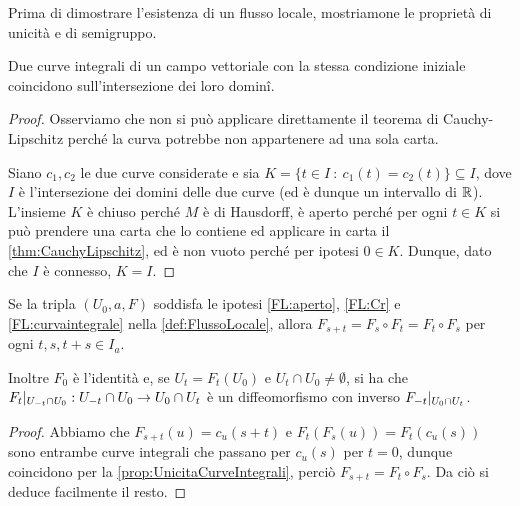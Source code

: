 Prima di dimostrare l'esistenza di un flusso locale, mostriamone le proprietà di unicità e di semigruppo.
 
\begin{proposition} \label{prop:UnicitaCurveIntegrali}
	Due curve integrali di un campo vettoriale con la stessa condizione iniziale coincidono sull'intersezione dei loro dominî.
\end{proposition}

\begin{proof}
	Osserviamo che non si può applicare direttamente il teorema di Cauchy-Lipschitz perché la curva potrebbe non appartenere ad una sola carta.
	
	Siano $c_1,c_2$ le due curve considerate e sia $K=\{ t\in I\ : \ c_1(t)=c_2(t)\}\subseteq I$, dove $I$ è l'intersezione dei domini delle due curve (ed è dunque un intervallo di $\mathbb R$). L'insieme $K$ è chiuso perché $M$ è di Hausdorff, è aperto perché per ogni $t\in K$ si può prendere una carta che lo contiene ed applicare in carta il \cref{thm:CauchyLipschitz}, ed è non vuoto perché per ipotesi $0\in K$. Dunque, dato che $I$ è connesso, $K=I$.
\end{proof}

\begin{proposition}
	Se la tripla $(U_0,a,F)$ soddisfa le ipotesi \ref{FL:aperto}, \ref{FL:Cr} e \ref{FL:curvaintegrale} nella \cref{def:FlussoLocale}, allora $F_{s+t}=F_s\circ F_t=F_t\circ F_s$ per ogni $t,s,t+s\in I_a$.
	
	Inoltre $F_0$ è l'identità e, se $U_t=F_t(U_0)$ e $U_t\cap U_0\ne\emptyset$, si ha che $F_t|_{U_{-t}\cap U_0}:U_{-t}\cap U_0\to U_0\cap U_t$ è un diffeomorfismo con inverso $F_{-t}|_{U_0\cap U_t}$.
\end{proposition}

\begin{proof}
	Abbiamo che $F_{s+t}(u)=c_u(s+t)$ e $F_t(F_s(u))=F_t(c_u(s))$ sono entrambe curve integrali che passano per $c_u(s)$ per $t=0$, dunque coincidono per la \cref{prop:UnicitaCurveIntegrali}, perciò $F_{s+t}=F_t\circ F_s$. Da ciò si deduce facilmente il resto.
\end{proof}


